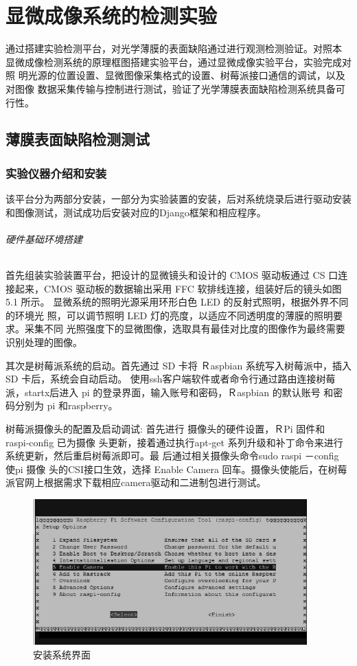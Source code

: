 \chapter{显微成像系统的检测实验}

通过搭建实验检测平台，对光学薄膜的表面缺陷通过进行观测检测验证。对照本 显微成像检测系统的原理框图搭建实验平台，通过显微成像实验平台，实验完成对照 明光源的位置设置、显微图像采集格式的设置、树莓派接口通信的调试，以及对图像 数据采集传输与控制进行测试，验证了光学薄膜表面缺陷检测系统具备可行性。

\section{薄膜表面缺陷检测测试}

\subsection{实验仪器介绍和安装}
该平台分为两部分安装，一部分为实验装置的安装，后对系统烧录后进行驱动安装和图像测试，测试成功后安装对应的Django框架和相应程序。

\subparagraph{硬件基础环境搭建}

首先组装实验装置平台，把设计的显微镜头和设计的 CMOS 驱动板通过 CS 口连 接起来，CMOS 驱动板的数据输出采用 FFC 软排线连接，组装好后的镜头如图 5.1 所示。
显微系统的照明光源采用环形白色 LED 的反射式照明，根据外界不同的环境光 照，可以调节照明 LED 灯的亮度，以适应不同透明度的薄膜的照明要求。采集不同 光照强度下的显微图像，选取具有最佳对比度的图像作为最终需要识别处理的图像。 

其次是树莓派系统的启动。首先通过 SD 卡将 Ｒaspbian
系统写入树莓派中，插入 SD 卡后，系统会自动启动。
使用ssh客户端软件或者命令行通过路由连接树莓派，startx后进入
pi 的登录界面，输入账号和密码，Ｒaspbian 的默认账号
和密码分别为 pi 和raspberry。

树莓派摄像头的配置及启动调试: 首先进行
摄像头的硬件设置，ＲPi 固件和 raspi-config 已为摄像
头更新，接着通过执行apt-get 系列升级和补丁命令来进行系统更新，然后重启树莓派即可。最
后通过相关摄像头命令sudo raspi －config 使pi 摄像
头的CSI接口生效，选择 Enable Camera 回车。摄像头使能后，在树莓派官网上根据需求下载相应camera驱动和二进制包进行测试。
\begin{figure}[h]
\centering
\includegraphics[width=0.7\linewidth]{Figure/rasp_4}
\caption{安装系统界面}
\label{fig:rasp_4}
\end{figure}

